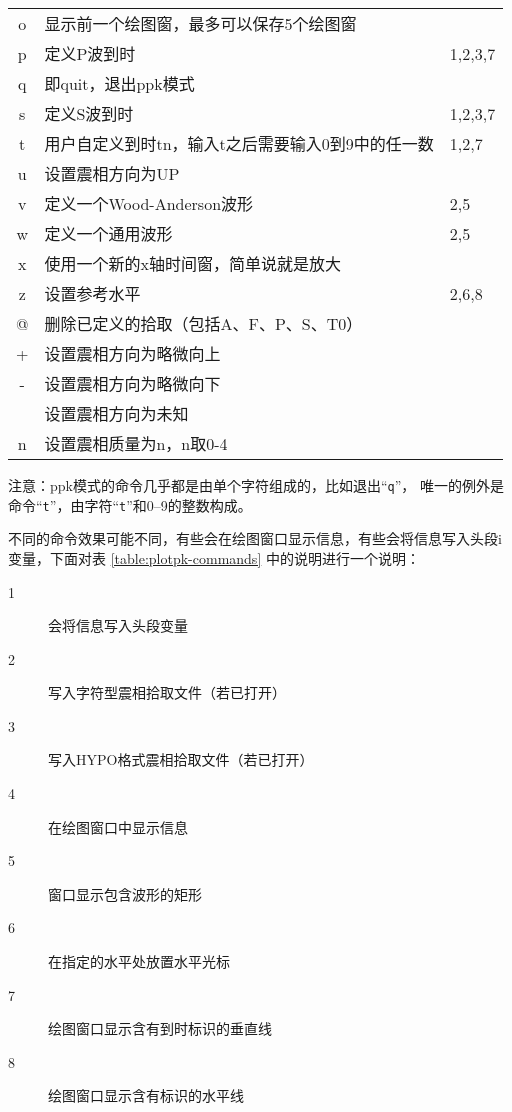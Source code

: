 \begin{center}
\begin{longtable}{cll}
o       &   显示前一个绘图窗，最多可以保存5个绘图窗 &           \\
p       &   定义P波到时                             &   1,2,3,7 \\
q       &   即quit，退出ppk模式                     &           \\
s       &   定义S波到时                             &   1,2,3,7 \\
t       &   用户自定义到时tn，输入t之后需要输入0到9中的任一数   &   1,2,7\\
u       &   设置震相方向为UP                        &           \\
v       &   定义一个Wood-Anderson波形               &   2,5     \\
w       &   定义一个通用波形                        &   2,5     \\
x       &   使用一个新的x轴时间窗，简单说就是放大   &           \\
z       &   设置参考水平                            &   2,6,8   \\
@       &   删除已定义的拾取（包括A、F、P、S、T0）  &           \\
+       &   设置震相方向为略微向上                  &           \\
-       &   设置震相方向为略微向下                  &           \\
\lstinline[showspaces]! !   &   设置震相方向为未知  &           \\
n       &   设置震相质量为n，n取0-4                 &           \\
\end{longtable}
\end{center}

注意：ppk模式的命令几乎都是由单个字符组成的，比如退出``\texttt{q}''，
唯一的例外是命令``\texttt{t}''，由字符``\texttt{t}''和0--9的整数构成。

不同的命令效果可能不同，有些会在绘图窗口显示信息，有些会将信息写入头段i
变量，下面对表 \ref{table:plotpk-commands} 中的说明进行一个说明：
\begin{description}
\item [1] 会将信息写入头段变量
\item [2] 写入字符型震相拾取文件（若已打开）
\item [3] 写入HYPO格式震相拾取文件（若已打开）
\item [4] 在绘图窗口中显示信息
\item [5] 窗口显示包含波形的矩形
\item [6] 在指定的水平处放置水平光标
\item [7] 绘图窗口显示含有到时标识的垂直线
\item [8] 绘图窗口显示含有标识的水平线
\end{description}

